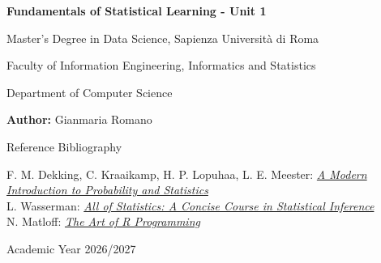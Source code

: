 \documentclass{report}
\begin{document}
\begin{titlepage}
    \centering
    \vspace*{2cm}
    
    {\Huge \bfseries Fundamentals of Statistical Learning - Unit 1 \par}
    \vspace{1.5cm}
    
    {\Large Master's Degree in Data Science, Sapienza Università di Roma \par}
    {\large Faculty of Information Engineering, Informatics and Statistics \par}
    \vspace{0.5cm}
    
    {\large Department of Computer Science \par}
    \vspace{3cm}
    
    {\Large \textbf{Author:} Gianmaria Romano \par}
    \vspace{3cm}

    {\Large Reference Bibliography \par}
    {\large F. M. Dekking, C. Kraaikamp, H. P. Lopuhaa, L. E. Meester: \href{https://cis.temple.edu/~latecki/Courses/CIS2033-Spring13/Modern_intro_probability_statistics_Dekking05.pdf}{\textit{A Modern Introduction to Probability and Statistics}} \\
    L. Wasserman: \href{https://egrcc.github.io/docs/math/all-of-statistics.pdf}{\textit{All of Statistics: A Concise Course in Statistical Inference}} \\
    N. Matloff: \href{https://events.psai.ph/2018/ac/downloads/trainings/T3/book_matloff.pdf}{\textit{The Art of R Programming}} \\}
    \vfill
    
    {\large Academic Year 2026/2027 \par}
    \vspace*{1cm}
\end{titlepage}

\clearpage
\end{document}
